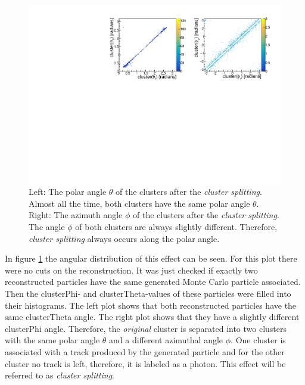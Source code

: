 \documentclass[a4paper,11pt,twosided,final,german,openbib,pdftex,listof=totoc,bibliography=totoc]{scrbook}
\begin{document}
\begin{figure}[h!]
	\centering
	\includegraphics[width=\textwidth]{AnhangPlots/ttpp.pdf}
	\caption[Cluster Splitting Angle Distribution]{Left: The polar angle $\theta$ of the clusters after the \textit{cluster splitting}. Almost all the time, both clusters have the same polar angle $\theta$.  Right: The azimuth angle $\phi$ of the clusters after the \textit{cluster splitting}. The angle $\phi$ of both clusters are always slightly different. Therefore, \textit{cluster splitting} always occurs along the polar angle.}
	\label{fig:clusterSplittingAngle}
\end{figure}








In figure \ref{fig:clusterSplittingAngle} the angular distribution of this effect can be seen. For this plot there were no cuts on the reconstruction. It was just checked if exactly two reconstructed particles have the same generated Monte Carlo particle associated. Then the clusterPhi- and clusterTheta-values of these particles were filled into their histograms. The left plot shows that both reconstructed particles have the same clusterTheta angle. The right plot shows that they have a slightly different clusterPhi angle. Therefore, the \textit{original} cluster  is separated into two clusters with the same polar angle $\theta$ and a different azimuthal angle $\phi$. One cluster is associated with a track produced by the generated particle and for the other cluster no track is left, therefore, it is labeled as a photon. This effect will be referred to as \textit{cluster splitting}.
\end{document}

